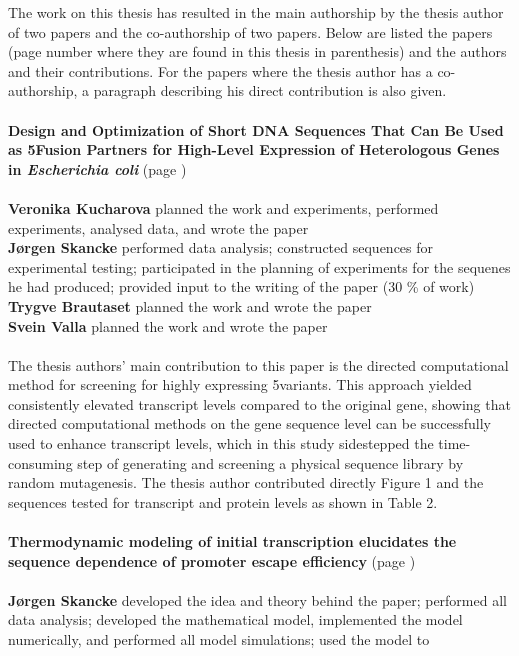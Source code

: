 The work on this thesis has resulted in the main authorship by the thesis
author of two papers and the co-authorship of two papers. Below are listed the
papers (page number where they are found in this thesis in parenthesis) and the
authors and their contributions. For the papers where the thesis author has a
co-authorship, a paragraph describing his direct contribution is also given.
\\
\\
\textbf{Design and Optimization of Short DNA Sequences That Can Be Used as
5\protect\ppp Fusion Partners for High-Level Expression of Heterologous Genes
in \textit{Escherichia coli}} (page \pageref{vero_paper})\\
\\
\textbf{Veronika Kucharova} planned the work and experiments, performed
experiments, analysed data, and wrote the paper\\
\textbf{J\o rgen Skancke} performed data analysis; constructed
sequences for experimental testing; participated in the planning of experiments
for the sequenes he had produced; provided input to the writing of the
paper (30 \% of work)\\
\textbf{Trygve Brautaset} planned the work and wrote the paper\\
\textbf{Svein Valla} planned the work and wrote the paper\\
\\
The thesis authors' main contribution to this paper is the directed
computational method for screening for highly expressing 5\ppp variants. This
approach yielded consistently elevated transcript levels compared to the
original gene, showing that directed computational methods on the gene sequence
level can be successfully used to enhance transcript levels, which in this
study sidestepped the time-consuming step of generating and screening a
physical sequence library by random mutagenesis. The thesis author contributed
directly Figure 1 and the sequences tested for transcript and protein levels as
shown in Table 2.
\\
\\
\textbf{Thermodynamic modeling of initial transcription elucidates the
sequence dependence of promoter escape efficiency} (page \pageref{chap:initiation_paper})\\
\\
\textbf{J\o rgen Skancke} developed the idea and theory behind the paper;
performed all data analysis; developed the mathematical model, implemented the
model numerically, and performed all model simulations; used the model to
